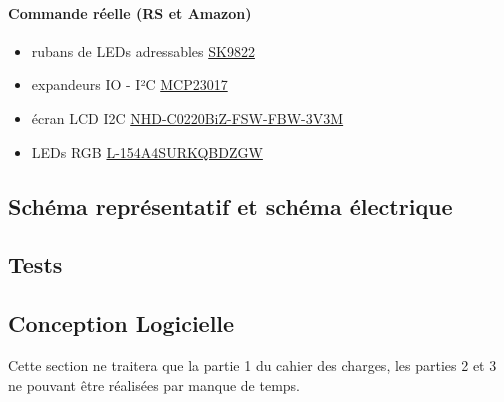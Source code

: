 \documentclass[12pt]{report}
\begin{document}
	\paragraph{Commande réelle (RS et Amazon)}
	\begin{itemize}[label=$-$]
		\item rubans de LEDs adressables \href{https://fr.aliexpress.com/item/1005006918408592.html?spm=a2g0o.productlist.main.19.fbb0788296kxRo&algo_pvid=72d2c9a9-ec47-4e4b-9d14-7e90be35485c&algo_exp_id=72d2c9a9-ec47-4e4b-9d14-7e90be35485c-9&pdp_npi=4%40dis!EUR!18.92!18.92!!!145.68!145.68!%402103888a17169934968957029e0b2f!12000038723750387!sea!FR!0!AB&curPageLogUid=lAauznpLAY1Y&utparam-url=scene%3Asearch%7Cquery_from%3A}{SK9822}\\
		\item expandeurs IO - I²C \href{https://fr.farnell.com/microchip/mcp23017-e-sp/16-bit-expander-i-o-i2c-i-f/dp/1332088}{MCP23017}\\
		\item écran LCD I2C \href{https://fr.rs-online.com/web/p/afficheurs-monochromes-lcd/2644045?searchId=b08a66da-698d-420f-a525-b4944d7ccd96&gb=s}{NHD-C0220BiZ-FSW-FBW-3V3M}\\
		\item LEDs RGB \href{https://fr.rs-online.com/web/p/leds/1651767?gb=s}{L-154A4SURKQBDZGW}\\
	\end{itemize}
	\subsection{Schéma représentatif et schéma électrique}
	\subsection{Tests}
	\subsection{Conception Logicielle}
	Cette section ne traitera que la partie 1 du cahier des charges, les parties 2 et 3 ne pouvant être réalisées par manque de temps.\\
\end{document}
